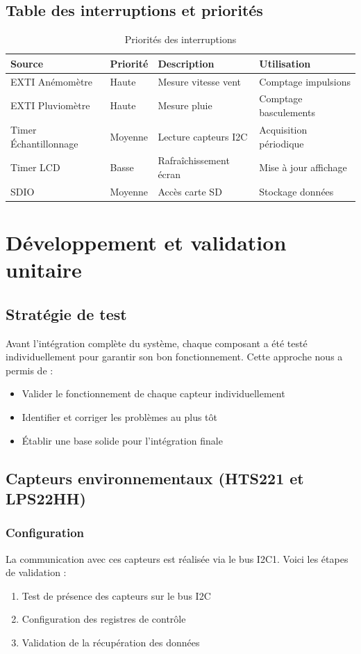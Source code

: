 \documentclass[12pt]{article}
\begin{document}
\subsection{Table des interruptions et priorités}
\begin{table}[H]
\centering
\caption{Priorités des interruptions}
\begin{tabular}{|l|l|l|l|}
\hline
\textbf{Source} & \textbf{Priorité} & \textbf{Description} & \textbf{Utilisation} \\
\hline
EXTI Anémomètre & Haute & Mesure vitesse vent & Comptage impulsions \\
\hline
EXTI Pluviomètre & Haute & Mesure pluie & Comptage basculements \\
\hline
Timer Échantillonnage & Moyenne & Lecture capteurs I2C & Acquisition périodique \\
\hline
Timer LCD & Basse & Rafraîchissement écran & Mise à jour affichage \\
\hline
SDIO & Moyenne & Accès carte SD & Stockage données \\
\hline
\end{tabular}
\end{table}


\section{Développement et validation unitaire}

\subsection{Stratégie de test}
Avant l'intégration complète du système, chaque composant a été testé individuellement pour garantir son bon fonctionnement. Cette approche nous a permis de :
\begin{itemize}
    \item Valider le fonctionnement de chaque capteur individuellement
    \item Identifier et corriger les problèmes au plus tôt
    \item Établir une base solide pour l'intégration finale
\end{itemize}

\subsection{Capteurs environnementaux (HTS221 et LPS22HH)}
\subsubsection{Configuration}
La communication avec ces capteurs est réalisée via le bus I2C1. Voici les étapes de validation :
\begin{enumerate}
    \item Test de présence des capteurs sur le bus I2C
    \item Configuration des registres de contrôle
    \item Validation de la récupération des données
\end{enumerate}
\end{document}
